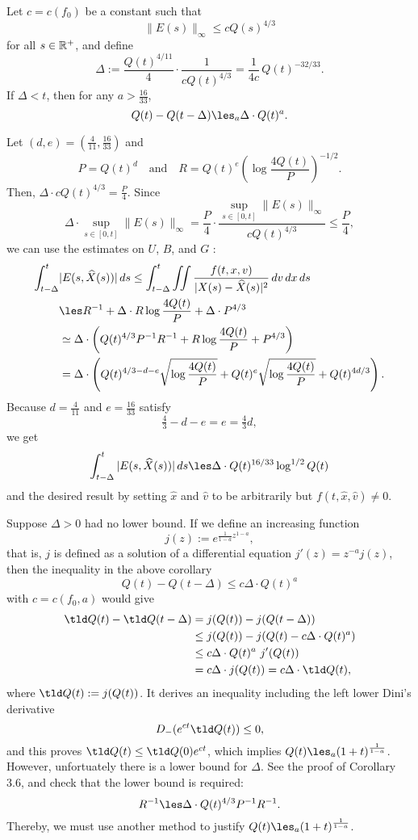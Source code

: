 \documentclass[11pt]{amsart}
\begin{document}
\begin{cor}
Let $c=c(f_0)$ be a constant such that
\[\|E(s)\|_\infty\le cQ(s)^{4/3}\]
for all $s\in\mathbb{R}^+$, and define
\[\Delta:=\frac{Q(t)^{4/11}}4\cdot\frac1{cQ(t)^{4/3}}=\frac1{4c}\,Q(t)^{-32/33}.\]
If $\Delta<t$, then for any $a>\frac{16}{33}$,
\[Q(t)-Q(t-\Delta)\les_a\Delta\cdot Q(t)^a.\]
\end{cor}
\begin{pf}
Let $(d,e)=(\frac4{11},\frac{16}{33})$ and
\[P=Q(t)^d\quad\text{and}\quad R=Q(t)^e(\log\frac{4Q(t)}P)^{-1/2}.\]
Then, $\Delta\cdot cQ(t)^{4/3}=\frac P4$.
Since
\[\Delta\cdot\sup_{s\in[0,t]}\|E(s)\|_\infty=\frac P4\cdot\frac{\sup_{s\in[0,t]}\|E(s)\|_\infty}{cQ(t)^{4/3}}\le\frac P4,\]
we can use the estimates on $U$, $B$, and $G$ :
\begin{align*}
\int_{t-\Delta}^t&|E(s,\hat X(s))|\,ds
\le\int_{t-\Delta}^t\iint\frac{f(t,x,v)}{|X(s)-\hat X(s)|^2}\,dv\,dx\,ds\\
&\les R^{-1}+\Delta\cdot R\log\frac{4Q(t)}P+\Delta\cdot P^{4/3}\\
&\simeq\Delta\cdot\left(Q(t)^{4/3}P^{-1}R^{-1}+R\log\frac{4Q(t)}P+P^{4/3}\right)\\
&=\Delta\cdot\left(Q(t)^{4/3-d-e}\sqrt{\log\frac{4Q(t)}P}+Q(t)^e\sqrt{\log\frac{4Q(t)}P}+Q(t)^{4d/3}\right).
\end{align*}
Because $d=\frac4{11}$ and $e=\frac{16}{33}$ satisfy
\[\tfrac43-d-e=e=\tfrac43d,\]
we get
\[\int_{t-\Delta}^t|E(s,\hat X(s))|\,ds\les\Delta\cdot Q(t)^{16/33}\log^{1/2}Q(t)\]
and the desired result by setting $\hat x$ and $\hat v$ to be arbitrarily but $f(t,\hat x,\hat v)\ne0$.
\end{pf}
\begin{rmk}
Suppose $\Delta>0$ had no lower bound.
If we define an increasing function
\[j(z):=e^{\frac1{1-a}z^{1-a}},\]
that is, $j$ is defined as a solution of a differential equation $j'(z)=z^{-a}j(z)$, then the inequality in the above corollary
\[Q(t)-Q(t-\Delta)\le c\Delta\cdot Q(t)^a\]
with $c=c(f_0,a)$ would give
\begin{align*}
\tld Q(t)-\tld Q(t-\Delta)
&=j(Q(t))-j(Q(t-\Delta))\\
&\le j(Q(t))-j(Q(t)-c\Delta\cdot Q(t)^a)\\
&\le c\Delta\cdot Q(t)^a\ j'(Q(t))\\
&=c\Delta\cdot j(Q(t))=c\Delta\cdot\tld Q(t),
\end{align*}
where $\tld Q(t):=j(Q(t))$.
It derives an inequality including the left lower Dini's derivative
\[D_-(e^{ct}\tld Q(t))\le0,\]
and this proves $\tld Q(t)\le\tld Q(0)e^{ct}$, which implies $Q(t)\les_a(1+t)^{\frac1{1-a}}$.
However, unfortuately there is a lower bound for $\Delta$.
See the proof of Corollary 3.6, and check that the lower bound is required:
\[R^{-1}\les\Delta\cdot Q(t)^{4/3}P^{-1}R^{-1}.\]
Thereby, we must use another method to justify $Q(t)\les_a(1+t)^{\frac1{1-a}}$.
\end{rmk}
\end{document}
